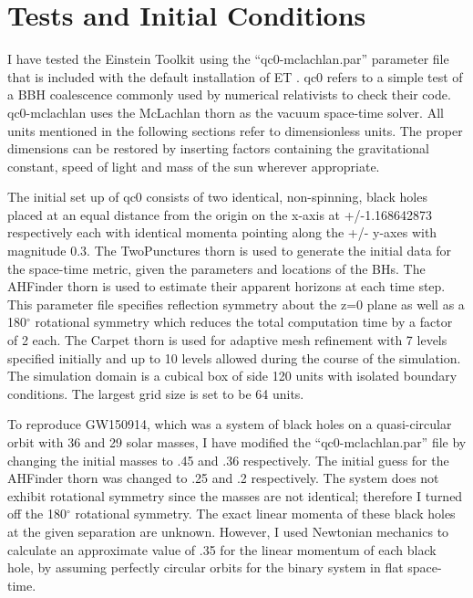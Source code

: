\documentclass[aps,twocolumn,secnumarabic,nobalancelastpage,amsmath,amssymb,
nofootinbib]{revtex4}
\begin{document}
	
	
	\section{Tests and Initial Conditions}
	
	I have tested the Einstein Toolkit using the ``qc0-mclachlan.par'' parameter file that is included with the default installation of ET \cite{intro}. qc0 refers to a simple test of a BBH coalescence commonly used by numerical relativists to check their code. qc0-mclachlan uses the McLachlan thorn as the vacuum space-time solver. All units mentioned in the following sections refer to dimensionless units. The proper dimensions can be restored by inserting factors containing the gravitational constant, speed of light and mass of the sun wherever appropriate. 
	\newline
	
	The initial set up of qc0 consists of two identical, non-spinning, black holes placed at an equal distance from the origin on the x-axis at +/-1.168642873  respectively each with identical momenta pointing along the +/- y-axes with magnitude 0.3. The TwoPunctures thorn is used to generate the initial data for the space-time metric, given the parameters and locations of the BHs. The AHFinder thorn is used to estimate their apparent horizons at each time step. This parameter file specifies reflection symmetry about the z=0 plane as well as a 180$^{\circ}$ rotational symmetry which reduces the total computation time by a factor of 2 each. The Carpet thorn is used for adaptive mesh refinement with 7 levels specified initially and up to 10 levels allowed during the course of the simulation. The simulation domain is a cubical box of side 120 units with isolated boundary conditions. The largest grid size is set to be 64 units.
	\newline
	
	To reproduce GW150914, which was a system of black holes on a quasi-circular orbit with 36 and 29 solar masses, I have modified the ``qc0-mclachlan.par'' file by changing the initial masses to .45 and .36 respectively. The initial guess for the AHFinder thorn was changed to .25 and .2 respectively. The system does not exhibit rotational symmetry since the masses are not identical; therefore I turned off the 180$^{\circ}$ rotational symmetry. The exact linear momenta of these black holes at the given separation are unknown. However, I used Newtonian mechanics to calculate an approximate value of .35 for the linear momentum of each black hole, by assuming perfectly circular orbits for the binary system in flat space-time.
	\newline
	
\end{document}

